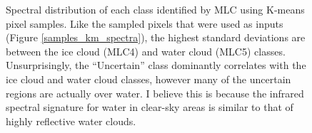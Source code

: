 \documentclass[12pt]{article}
\begin{document}
\clearpage

\begin{figure}[h!]
    \centering

    \begin{center}
    \end{center}

    \caption{Spectral distribution of each class identified by MLC using K-means pixel samples. Like the sampled pixels that were used as inputs (Figure \ref{samples_km_spectra}), the highest standard deviations are between the ice cloud (MLC4) and water cloud (MLC5) classes. Unsurprisingly, the ``Uncertain'' class dominantly correlates with the ice cloud and water cloud classes, however many of the uncertain regions are actually over water. I believe this is because the infrared spectral signature for water in clear-sky areas is similar to that of highly reflective water clouds.}
    \label{mlc_km_spectra}
\end{figure}
\end{document}
